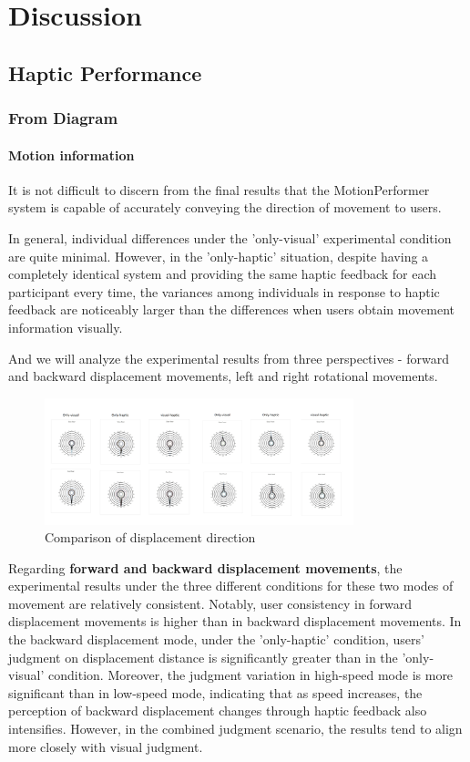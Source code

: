\chapter{Discussion}

\section{Haptic Performance}
\subsection{From Diagram}
\subsubsection{Motion information}
It is not difficult to discern from the final results that the MotionPerformer system is capable of accurately conveying the direction of movement to users.

In general, individual differences under the 'only-visual' experimental condition are quite minimal. However, in the 'only-haptic' situation, despite having a completely identical system and providing the same haptic feedback for each participant every time, the variances among individuals in response to haptic feedback are noticeably larger than the differences when users obtain movement information visually.

And we will analyze the experimental results from three perspectives - forward and backward displacement movements, left and right rotational movements.

\begin{figure}[h]
\centering
\includegraphics[width=0.8\textwidth]{A_thesis/figures/FrontandRear.png}
\caption{Comparison of displacement direction}
\end{figure}

\newpage
Regarding \textbf{forward and backward displacement movements}, the experimental results under the three different conditions for these two modes of movement are relatively consistent. Notably, user consistency in forward displacement movements is higher than in backward displacement movements. In the backward displacement mode, under the 'only-haptic' condition, users' judgment on displacement distance is significantly greater than in the 'only-visual' condition. Moreover, the judgment variation in high-speed mode is more significant than in low-speed mode, indicating that as speed increases, the perception of backward displacement changes through haptic feedback also intensifies. However, in the combined judgment scenario, the results tend to align more closely with visual judgment.

